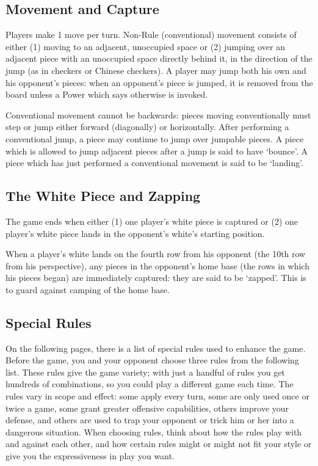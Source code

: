 \documentclass[../rulebook.tex]{subfiles}
\begin{document}
\subsection*{Movement and Capture}
Players make 1 move per turn.
Non-Rule (conventional) movement consists of either
(1) moving to an adjacent, unoccupied space or
(2) jumping over an adjacent piece with an unoccupied
space directly behind it, in the direction of the jump
(as in checkers or Chinese checkers).
A player may jump both his own and his opponent's pieces:
when an opponent's piece is jumped, it is removed from the board
unless a Power which says otherwise is invoked.

Conventional movement cannot be backwards:
pieces moving conventionally must step or jump either forward
(diagonally) or horizontally.
After performing a conventional jump,
a piece may continue to jump over jumpable pieces.
A piece which is allowed to jump adjacent pieces after a jump
is said to have `bounce'.
A piece which has just performed a conventional movement
is said to be `landing'.

\subsection*{The White Piece and Zapping}
The game ends when either (1) one player's white piece is captured or
(2) one player's white piece lands in the opponent's
white's starting position.

When a player's white lands on the fourth row from his opponent
(the 10th row from his perspective),
any pieces in the opponent's home base
(the rows in which his pieces began) are immediately captured:
they are said to be `zapped'.
This is to guard against camping of the home base.

\subsection*{Special Rules}
On the following pages, there is a list of special rules used
to enhance the game.
Before the game, you and your opponent choose three rules from the 
following list. 
These rules give the game variety; with just a handful of rules
you get hundreds of combinations, so you could play a different game
each time.
The rules vary in scope and effect: some apply every turn,
some are only used once or twice a game,
some grant greater offensive capabilities,
others improve your defense,
and others are used to trap your opponent or trick him or her
into a dangerous situation.
When choosing rules, think about how the rules play
with and against each other, and how certain rules might or might
not fit your style or give you the expressiveness in play you want.
\end{document}
